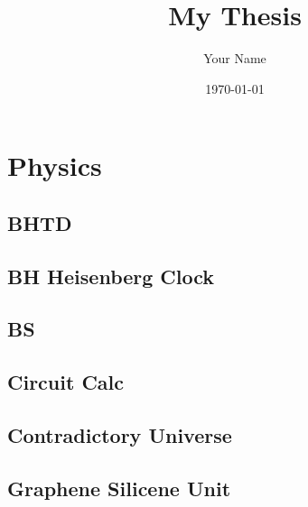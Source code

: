 \documentclass{report}
\title{My Thesis}
\author{Your Name}
\date{\today}
\begin{document}
\maketitle

\tableofcontents

\part{Physics}

\chapter{BHTD}


\chapter{BH Heisenberg Clock}


\chapter{BS}


\chapter{Circuit Calc}


\chapter{Contradictory Universe}


\chapter{Graphene Silicene Unit}


%

%
\end{document}
